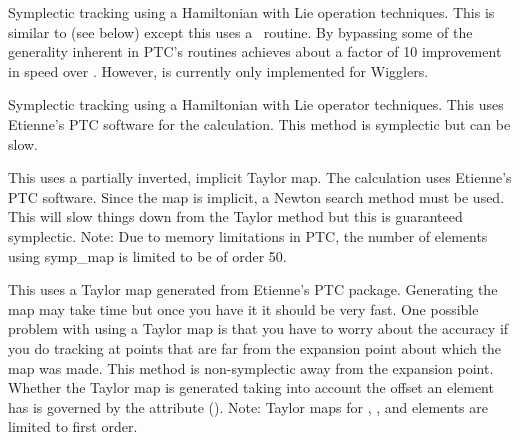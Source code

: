 \begin{description}
\item[\vn{Symp_Lie_Bmad}]
Symplectic tracking using a Hamiltonian with Lie operation techniques.
This is similar to  (see below) except this uses a
\bmad\ routine. By bypassing some of the generality inherent in PTC's routines
 achieves about a factor of 10 improvement in speed over
. However,  is
currently only implemented for Wigglers.

\item[\vn{Symp_Lie_PTC}]
Symplectic tracking using a Hamiltonian with Lie operator techniques.
This uses Etienne's PTC software for the calculation. This method is
symplectic but can be slow.

\item[\vn{Symp_Map}]
This uses a partially inverted, implicit Taylor map. The calculation
uses Etienne's PTC software.  Since the map is implicit, a Newton
search method must be used. This will slow things down from the Taylor
method but this is guaranteed symplectic. Note: Due to memory limitations
in PTC, the number of elements using symp_map is limited to be of order 50.

\item[\vn{Taylor}]
This uses a Taylor map generated from Etienne's PTC
package. Generating the map may take time but once you have it it
should be very fast. One possible problem with using a Taylor map is
that you have to worry about the accuracy if you do tracking at points
that are far from the expansion point about which the map was
made. This method is non-symplectic away from the expansion
point. Whether the Taylor map is generated taking into account the
offset an element has is governed by the 
attribute (). Note: Taylor maps for , ,
and  elements are limited to first order.

\end{description}

\vfill \break
{\vfill}

